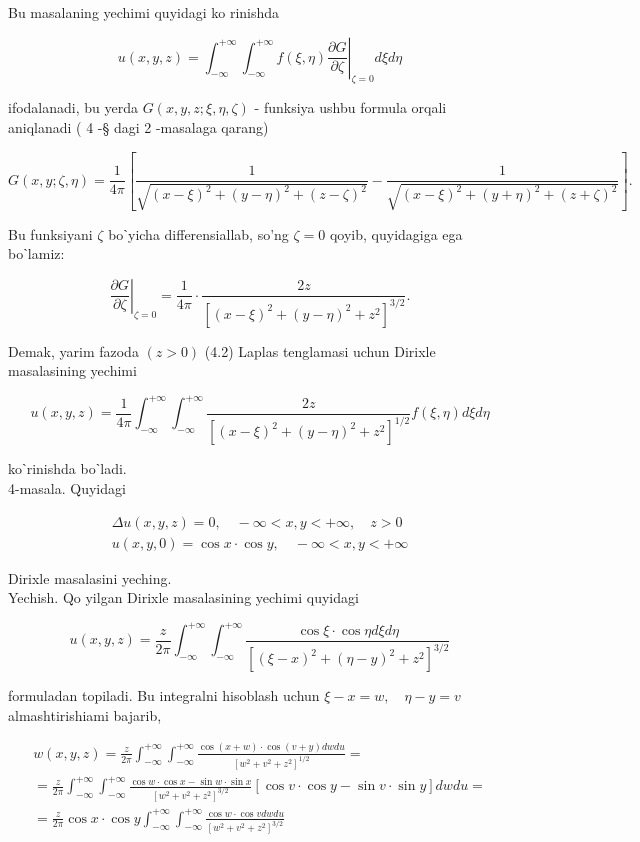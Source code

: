 \documentclass[10pt]{article}
\begin{document}
Bu masalaning yechimi quyidagi ko rinishda

$$
u(x, y, z)=\left.\int_{-\infty}^{+\infty} \int_{-\infty}^{+\infty} f(\xi, \eta) \frac{\partial G}{\partial \zeta}\right|_{\zeta=0} d \xi d \eta
$$

ifodalanadi, bu yerda $G(x, y, z ; \xi, \eta, \zeta)$ - funksiya ushbu formula orqali aniqlanadi ( 4 -§ dagi 2 -masalaga qarang)

$$
G(x, y ; \zeta, \eta)=\frac{1}{4 \pi}\left[\frac{1}{\sqrt{(x-\xi)^{2}+(y-\eta)^{2}+(z-\zeta)^{2}}}-\frac{1}{\sqrt{(x-\xi)^{2}+(y+\eta)^{2}+(z+\zeta)^{2}}}\right] .
$$

Bu funksiyani $\zeta$ boˋyicha differensiallab, so'ng $\zeta=0$ qoyib, quyidagiga ega boˋlamiz:

$$
\left.\frac{\partial G}{\partial \zeta}\right|_{\zeta=0}=\frac{1}{4 \pi} \cdot \frac{2 z}{\left[(x-\xi)^{2}+(y-\eta)^{2}+z^{2}\right]^{3 / 2}} .
$$

Demak, yarim fazoda $(z>0)$ (4.2) Laplas tenglamasi uchun Dirixle masalasining yechimi


\begin{equation*}
u(x, y, z)=\frac{1}{4 \pi} \int_{-\infty}^{+\infty} \int_{-\infty}^{+\infty} \frac{2 z}{\left[(x-\xi)^{2}+(y-\eta)^{2}+z^{2}\right]^{1 / 2}} f(\xi, \eta) d \xi d \eta \tag{4.80}
\end{equation*}


koˋrinishda boˋladi.\\
4-masala. Quyidagi

$$
\begin{gathered}
\Delta u(x, y, z)=0, \quad-\infty<x, y<+\infty, \quad z>0 \\
u(x, y, 0)=\cos x \cdot \cos y, \quad-\infty<x, y<+\infty
\end{gathered}
$$

Dirixle masalasini yeching.\\
Yechish. Qo yilgan Dirixle masalasining yechimi quyidagi

$$
u(x, y, z)=\frac{z}{2 \pi} \int_{-\infty}^{+\infty} \int_{-\infty}^{+\infty} \frac{\cos \xi \cdot \cos \eta d \xi d \eta}{\left[(\xi-x)^{2}+(\eta-y)^{2}+z^{2}\right]^{3 / 2}}
$$

formuladan topiladi. Bu integralni hisoblash uchun $\xi-x=w, \quad \eta-y=v$ almashtirishiami bajarib,


\begin{gather*}
w(x, y, z)=\frac{z}{2 \pi} \int_{-\infty}^{+\infty} \int_{-\infty}^{+\infty} \frac{\cos (x+w) \cdot \cos (v+y) d w d u}{\left[w^{2}+v^{2}+z^{2}\right]^{1 / 2}}= \\
=\frac{z}{2 \pi} \int_{-\infty}^{+\infty} \int_{-\infty}^{+\infty} \frac{\cos w \cdot \cos x-\sin w \cdot \sin x}{\left[w^{2}+v^{2}+z^{2}\right]^{3 / 2}}[\cos v \cdot \cos y-\sin v \cdot \sin y] d w d u= \\
=\frac{z}{2 \pi} \cos x \cdot \cos y \int_{-\infty}^{+\infty} \int_{-\infty}^{+\infty} \frac{\cos w \cdot \cos v d w d u}{\left[w^{2}+v^{2}+z^{2}\right]^{3 / 2}} \tag{4.81}
\end{gather*}
\end{document}
